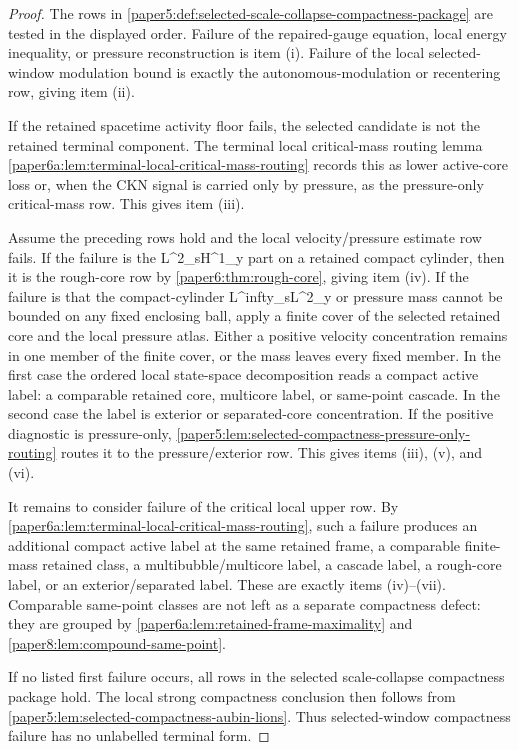 \documentclass[11pt]{amsart}
\def\({}%
\def\){}%
\def\infty{infty}%
\theoremstyle{plain}
\theoremstyle{definition}
\theoremstyle{remark}
\begin{document}
\begin{proof}
The rows in
\cref{paper5:def:selected-scale-collapse-compactness-package} are tested in
the displayed order.  Failure of the repaired-gauge equation, local energy
inequality, or pressure reconstruction is item \textup{(i)}.  Failure of the
local selected-window modulation bound is exactly the
autonomous-modulation or recentering row, giving item \textup{(ii)}.

If the retained spacetime activity floor fails, the selected candidate is not the
retained terminal component.  The terminal local critical-mass routing lemma
\cref{paper6a:lem:terminal-local-critical-mass-routing} records this as lower
active-core loss or, when the CKN signal is carried only by pressure, as the
pressure-only critical-mass row.  This gives item \textup{(iii)}.

Assume the preceding rows hold and the local velocity/pressure estimate row
fails.  If the failure is the \(L^2_sH^1_y\) part on a retained compact
cylinder, then it is the rough-core row by
\cref{paper6:thm:rough-core}, giving item \textup{(iv)}.  If the failure is
that the compact-cylinder \(L^\infty_sL^2_y\) or pressure mass cannot be
bounded on any fixed enclosing ball, apply a finite cover of the selected
retained core and the local pressure atlas.  Either a positive velocity
concentration remains in one member of the finite cover, or the mass leaves
every fixed member.  In the first case the ordered local state-space
decomposition reads a compact active label: a comparable retained core,
multicore label, or same-point cascade.  In the second case the label is
exterior or separated-core concentration.  If the positive diagnostic is
pressure-only, \cref{paper5:lem:selected-compactness-pressure-only-routing}
routes it to the pressure/exterior row.  This gives items
\textup{(iii)}, \textup{(v)}, and \textup{(vi)}.

It remains to consider failure of the critical local upper row.  By
\cref{paper6a:lem:terminal-local-critical-mass-routing}, such a failure
produces an additional compact active label at the same retained frame, a
comparable finite-mass retained class, a multibubble/multicore label, a
cascade label, a rough-core label, or an exterior/separated label.  These are
exactly items \textup{(iv)}--\textup{(vii)}.  Comparable same-point classes are
not left as a separate compactness defect: they are grouped by
\cref{paper6a:lem:retained-frame-maximality} and
\cref{paper8:lem:compound-same-point}.

If no listed first failure occurs, all rows in the selected scale-collapse
compactness package hold.  The local strong compactness conclusion then follows
from \cref{paper5:lem:selected-compactness-aubin-lions}.  Thus selected-window
compactness failure has no unlabelled terminal form.
\end{proof}
\end{document}
